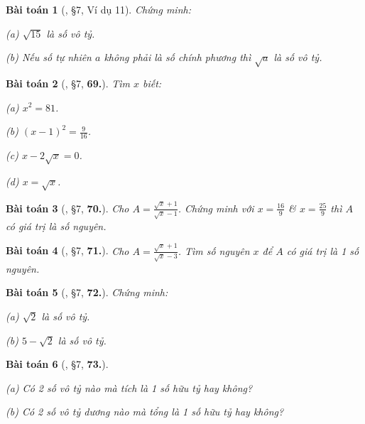 \documentclass{article}
\numberwithin{equation}{section}
\newtheorem{baitoan}{Bài toán}
\begin{document}
\begin{baitoan}[\cite{Binh_Toan_7_tap_1}, \S7, Ví dụ 11]
	Chứng minh:
	\begin{enumerate*}
		\item[(a)] $\sqrt{15}$ là số vô tỷ.
		\item[(b)] Nếu số tự nhiên $a$ không phải là số chính phương thì $\sqrt{a}$ là số vô tỷ.
	\end{enumerate*}
\end{baitoan}

\begin{baitoan}[\cite{Binh_Toan_7_tap_1}, \S7, \textbf{69.}]
	Tìm $x$ biết:
	\begin{enumerate*}
		\item[(a)] $x^2 = 81$.
		\item[(b)] $(x - 1)^2 = \frac{9}{16}$.
		\item[(c)] $x - 2\sqrt{x} = 0$.
		\item[(d)] $x = \sqrt{x}$.
	\end{enumerate*}
\end{baitoan}

\begin{baitoan}[\cite{Binh_Toan_7_tap_1}, \S7, \textbf{70.}]
	Cho $A = \frac{\sqrt{x} + 1}{\sqrt{x} - 1}$. Chứng minh với $x = \frac{16}{9}$ \& $x = \frac{25}{9}$ thì $A$ có giá trị là số nguyên.
\end{baitoan}

\begin{baitoan}[\cite{Binh_Toan_7_tap_1}, \S7, \textbf{71.}]
	Cho $A = \frac{\sqrt{x} + 1}{\sqrt{x} - 3}$. Tìm số nguyên $x$ để $A$ có giá trị là 1 số nguyên.
\end{baitoan}

\begin{baitoan}[\cite{Binh_Toan_7_tap_1}, \S7, \textbf{72.}]
	Chứng minh:
	\begin{enumerate*}
		\item[(a)] $\sqrt{2}$ là số vô tỷ.
		\item[(b)] $5 - \sqrt{2}$ là số vô tỷ.
	\end{enumerate*}
\end{baitoan}

\begin{baitoan}[\cite{Binh_Toan_7_tap_1}, \S7, \textbf{73.}]
	\begin{enumerate*}
		\item[(a)] Có 2 số vô tỷ nào mà tích là 1 số hữu tỷ hay không?
		\item[(b)] Có 2 số vô tỷ dương nào mà tổng là 1 số hữu tỷ hay không?
	\end{enumerate*}
\end{baitoan}
\end{document}
